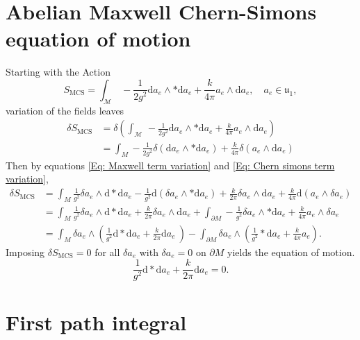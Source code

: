 \documentclass{article}
\begin{document}
\section{Abelian Maxwell Chern-Simons equation of motion}
\label{appendixamcseom}
Starting with the Action
\begin{equation}
    S_{\text{MCS}} = \int_{\mathcal{M}} \, -\frac{1}{2g^{2}} \mathrm{d}a_{e}\wedge * \mathrm{d}a_{e} + \frac{k}{4\pi}a_{e}\wedge \mathrm{d}a_{e},\quad a_{e}\in \mathfrak{u_{1}},
\end{equation}
variation of the fields leaves
\begin{align}
    \delta S_{\text{MCS}} &= \delta \left(\int_{\mathcal{M}} \, -\frac{1}{2g^{2}} \mathrm{d}a_{e}\wedge * \mathrm{d}a_{e} + \frac{k}{4\pi}a_{e}\wedge \mathrm{d}a_{e} \right)\nonumber \\
    &= \int_{M}-\frac{1}{2g^{2}}\delta\left(\mathrm{d}a_{e}\wedge * \mathrm{d}a_{e}\right)+\frac{k}{4\pi}\delta\left(a_{e}\wedge \mathrm{d}a_{e}\right)\nonumber
\end{align}
Then by equations \eqref{Eq: Maxwell term variation} and \eqref{Eq: Chern simons term variation}, 
\begin{align}
    \delta S_{\text{MCS}} &=\int_{M} \frac{1}{g^{2}}\delta a_{e}\wedge\mathrm{d}* \mathrm{d}a_{e} - \frac{1}{g^{2}}\mathrm{d}\left(\delta a_{e}\wedge * \mathrm{d}a_{e}\right) + \frac{k}{2\pi}\delta a_{e}\wedge \mathrm{d}a_{e} + \frac{k}{4\pi}\mathrm{d}\left(a_{e}\wedge \delta a_{e} \right)\nonumber\\
    &= \int_{M} \frac{1}{g^{2}}\delta a_{e}\wedge \mathrm{d}* \mathrm{d}a_{e} + \frac{k}{2\pi}\delta a_{e}\wedge \mathrm{d}a_{e} + \int_{\partial M}-\frac{1}{g^{2}}\delta a_{e}\wedge *\mathrm{d}a_{e} + \frac{k}{4\pi}a_{e}\wedge \delta a_{e}\nonumber\\
    &= \int_{M}\delta a_{e}\wedge \left(\frac{1}{g^{2}}\mathrm{d}* \mathrm{d}a_{e} + \frac{k}{2\pi}\mathrm{d}a_{e}\ \right)-\int_{\partial M}\delta a_{e}\wedge \left(\frac{1}{g^{2}}*\mathrm{d}a_{e} + \frac{k}{4\pi}a_{e}\right)\nonumber.
\end{align}
Imposing $\delta S_{\text{MCS}} = 0$ for all $\delta a_{e}$ with $\delta a_{e}=0$ on $\partial M$ yields the equation of motion.
\begin{equation}
    \frac{1}{g^{2}}\mathrm{d}*\mathrm{d}a_{e} + \frac{k}{2\pi}\mathrm{d}a_{e}=0.
\end{equation}


\section{First path integral}
\label{appendixfirstpathintegral}
\end{document}
